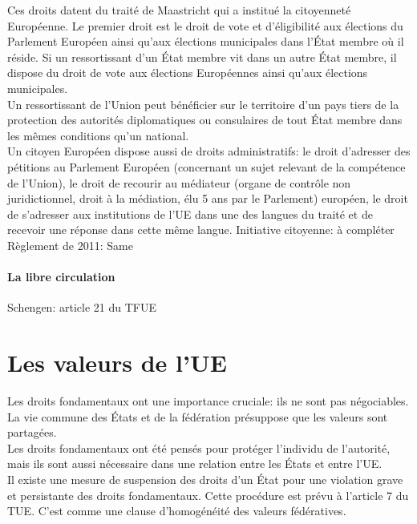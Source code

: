 \documentclass[12pt, a4paper, openany]{book}
\begin{document}
Ces droits datent du traité de Maastricht qui a institué la citoyenneté Européenne. Le premier droit est le droit de vote et d'éligibilité aux élections du Parlement Européen ainsi qu'aux élections municipales dans l'État membre où il réside. Si un ressortissant d'un État membre vit dans un autre État membre, il dispose du droit de vote aux élections Européennes ainsi qu'aux élections municipales. \\
Un ressortissant de l'Union peut bénéficier sur le territoire d'un pays tiers de la protection des autorités diplomatiques ou consulaires de tout État membre dans les mêmes conditions qu'un national. \\
Un citoyen Européen dispose aussi de droits administratifs: le droit d'adresser des pétitions au Parlement Européen (concernant un sujet relevant de la compétence de l'Union), le droit de recourir au médiateur (organe de contrôle non juridictionnel, droit à la médiation, élu 5 ans par le Parlement) européen, le droit de s'adresser aux institutions de l'UE dans une des langues du traité et de recevoir une réponse dans cette même langue. 
Initiative citoyenne: à compléter \\
Règlement de 2011: Same \\


\subsubsection{La libre circulation}

Schengen: article 21 du TFUE \\ %




\chapter{Les valeurs de l'UE}

Les droits fondamentaux ont une importance cruciale: ils ne sont pas négociables. La vie commune des États et de la fédération présuppose que les valeurs sont partagées. \\
Les droits fondamentaux ont été pensés pour protéger l'individu de l'autorité, mais ils sont aussi nécessaire dans une relation entre les États et entre l'UE. \\
Il existe une mesure de suspension des droits d'un État pour une violation grave et persistante des droits fondamentaux. Cette procédure est prévu à l'article 7 du TUE. C'est comme une clause d'homogénéité des valeurs fédératives. 
\end{document}
